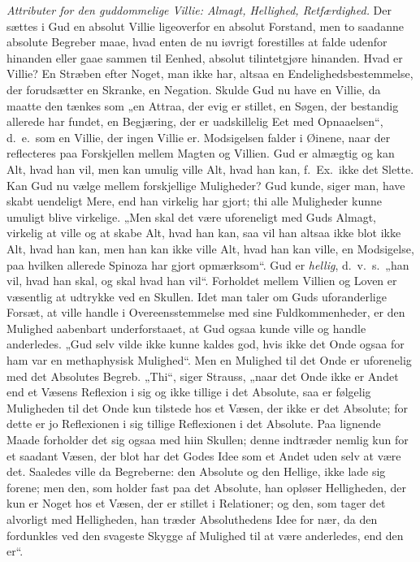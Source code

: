 \documentclass[12pt]{book}
\begin{document}
\emph{Attributer for den guddommelige Villie: Almagt, Hellighed,
Retfærdighed.} Der sættes i Gud en absolut Villie ligeoverfor en
absolut Forstand, men to saadanne absolute Begreber maae, hvad enten
de nu iøvrigt forestilles at falde udenfor hinanden eller gaae
sammen til Eenhed, absolut tilintetgjøre hinanden. Hvad er Villie?
En Stræben efter Noget, man ikke har, altsaa en
Endelighedsbestemmelse, der forudsætter en Skranke, en Negation.
Skulde Gud nu have en Villie, da maatte den tænkes som „en Attraa,
der evig er stillet, en Søgen, der bestandig allerede har fundet, en
Begjæring, der er uadskillelig Eet med Opnaaelsen“, d.\ e.\ som en
Villie, der ingen Villie er. Modsigelsen falder i Øinene, naar der
reflecteres paa Forskjellen mellem Magten og Villien. Gud er
almægtig og kan Alt, hvad han vil, men kan umulig ville Alt, hvad
han kan, f.\ Ex.\ ikke det Slette. Kan Gud nu vælge mellem
forskjellige Muligheder? Gud kunde, siger man, have skabt uendeligt
Mere, end han virkelig har gjort; thi alle Muligheder kunne umuligt
blive virkelige. „Men skal det være uforeneligt med Guds Almagt,
virkelig at ville og at skabe Alt, hvad han kan, saa vil han altsaa
ikke blot ikke Alt, hvad han kan, men han kan ikke ville Alt, hvad
han kan ville, en Modsigelse, paa hvilken allerede Spinoza har gjort
opmærksom“. Gud er \emph{hellig}, d.\ v.\ s.\ „han vil, hvad han
skal, og skal hvad han vil“. Forholdet mellem Villien og Loven er
væsentlig at udtrykke ved en Skullen. Idet man taler om Guds
uforanderlige Forsæt, at ville handle i Overeensstemmelse med sine
Fuldkommenheder, er den Mulighed aabenbart underforstaaet, at Gud
ogsaa kunde ville og handle anderledes.
„Gud selv vilde ikke kunne kaldes god, hvis ikke det Onde ogsaa for
ham var en methaphysisk Mulighed“. Men en Mulighed til det Onde
er uforenelig med det Absolutes Begreb. „Thi“, siger Strauss, „naar
det Onde ikke er Andet end et Væsens Reflexion i sig og ikke tillige
i det Absolute, saa er følgelig Muligheden til det Onde kun tilstede
hos et Væsen, der ikke er det Absolute; for dette er jo Reflexionen
i sig tillige Reflexionen i det Absolute. Paa lignende Maade
forholder det sig ogsaa med hiin Skullen; denne indtræder nemlig kun
for et saadant Væsen, der blot har det Godes Idee som et Andet uden
selv at være det. Saaledes ville da Begreberne: den Absolute og den
Hellige, ikke lade sig forene; men den, som holder fast paa det
Absolute, han opløser Helligheden, der kun er Noget hos et Væsen,
der er stillet i Relationer; og den, som tager det alvorligt med
Helligheden, han træder Absoluthedens Idee for nær, da den
fordunkles ved den svageste Skygge af Mulighed til at være
anderledes, end den er“.
\end{document}
